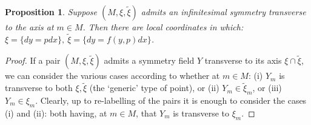 \documentclass[10pt]{amsart}
\newtheorem{prop}[thm]{Proposition}
\theoremstyle{definition}
\begin{document}
\begin{prop}\label{prop:genLNF}
    Suppose $(M, \xi, \tilde \xi)$ admits an infinitesimal symmetry transverse to the axis at $m\in M$. Then there are local coordinates in which: $\xi = \{ dy = pdx\} , ~\tilde \xi = \{ dy = f(y,p)dx\}$.
\end{prop}
\begin{proof}
If a pair $(M, \xi, \tilde\xi)$ admits a symmetry field $Y$ transverse to its axis $\xi\cap\tilde\xi$, we can consider the various cases according to whether at $m\in M$: (i) $Y_m$ is transverse to both $\xi, \tilde\xi$ (the `generic' type of point), or (ii) $Y_m\in \tilde\xi_m$, or (iii) $Y_m\in\xi_m$. Clearly, up to re-labelling of the pairs it is enough to consider the cases (i) and (ii): both having, at $m\in M$, that $Y_m$ is transverse to $\xi_m$.


\end{proof}
\end{document}
